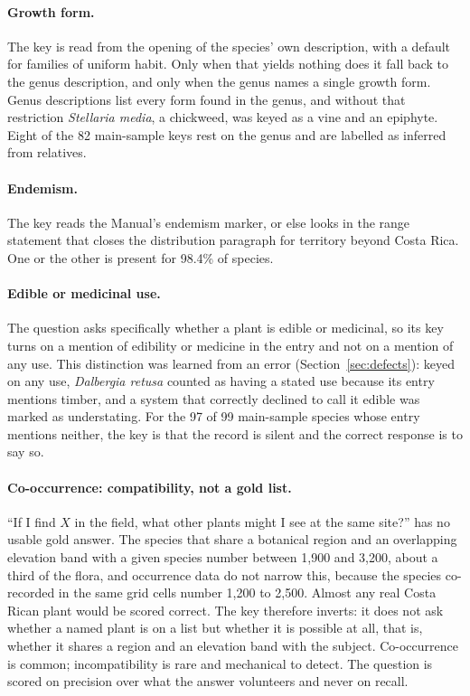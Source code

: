 \documentclass[11pt,a4paper]{article}
\begin{document}
\paragraph{Growth form.} The key is read from the opening of the species' own
description, with a default for families of uniform habit. Only when that yields
nothing does it fall back to the genus description, and only when the genus names a
single growth form. Genus descriptions list every form found in the genus, and
without that restriction \emph{Stellaria media}, a chickweed, was keyed as a vine and
an epiphyte. Eight of the 82 main-sample keys rest on the genus and are labelled as
inferred from relatives.

\paragraph{Endemism.} The key reads the Manual's endemism marker, or else looks in
the range statement that closes the distribution paragraph for territory beyond Costa
Rica. One or the other is present for 98.4\% of species.

\paragraph{Edible or medicinal use.} The question asks specifically whether a plant
is edible or medicinal, so its key turns on a mention of edibility or medicine in the
entry and not on a mention of any use. This distinction was learned from an error
(Section~\ref{sec:defects}): keyed on any use, \emph{Dalbergia retusa} counted as
having a stated use because its entry mentions timber, and a system that correctly
declined to call it edible was marked as understating. For the 97 of 99 main-sample
species whose entry mentions neither, the key is that the record is silent and the
correct response is to say so.

\paragraph{Co-occurrence: compatibility, not a gold list.} ``If I find $X$ in the
field, what other plants might I see at the same site?'' has no usable gold answer.
The species that share a botanical region and an overlapping elevation band with a
given species number between 1{,}900 and 3{,}200, about a third of the flora, and
occurrence data do not narrow this, because the species co-recorded in the same grid
cells number 1{,}200 to 2{,}500. Almost any real Costa Rican plant would be scored
correct. The key therefore inverts: it does not ask whether a named plant is on a
list but whether it is possible at all, that is, whether it shares a region and an
elevation band with the subject. Co-occurrence is common; incompatibility is rare
and mechanical to detect. The question is scored on precision over what the answer
volunteers and never on recall.
\end{document}
